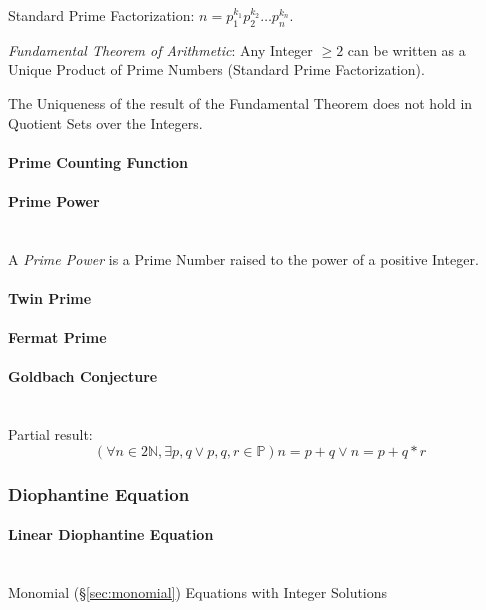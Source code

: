 Standard Prime Factorization: $n = p_1^{k_1} p_2^{k_2} \ldots
p_n^{k_n}$.

\emph{Fundamental Theorem of Arithmetic}: Any Integer $\geq 2$ can be
written as a Unique Product of Prime Numbers (Standard Prime
Factorization).

The Uniqueness of the result of the Fundamental Theorem does not hold
in Quotient Sets over the Integers.



\paragraph{Prime Counting Function}\label{sec:prime_counting}

\paragraph{Prime Power}\label{sec:prime_power}
\hfill \\

A \emph{Prime Power} is a Prime Number raised to the power of a
positive Integer.



\paragraph{Twin Prime}\label{sec:twin_prime}

\paragraph{Fermat Prime}\label{sec:fermat_prime}

\paragraph{Goldbach Conjecture}\label{sec:goldbach_conjecture}
\hfill \\

Partial result:
\[
  (\forall n \in 2\mathbb{N}, \exists p,q \vee p,q,r \in \mathbb{P})
  n = p + q \vee n = p + q * r
\]



\subsubsection{Diophantine Equation}\label{sec:diophantine_equation}

\paragraph{Linear Diophantine Equation}
\label{sec:linear_diophantine}
\hfill \\
Monomial (\S\ref{sec:monomial}) Equations with Integer Solutions

